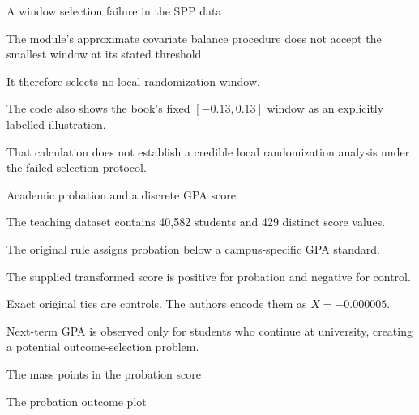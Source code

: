 \begin{frame}{A window selection failure in the SPP data}
\begin{items}
\item The module's approximate covariate balance procedure does not accept the smallest window at its stated threshold.
\item It therefore selects no local randomization window.
\item The code also shows the book's fixed $[-0.13,0.13]$ window as an explicitly labelled illustration.
\item That calculation does not establish a credible local randomization analysis under the failed selection protocol.
\end{items}
\end{frame}

\begin{frame}{Academic probation and a discrete GPA score}
\begin{items}
\item The teaching dataset contains 40,582 students and 429 distinct score values.
\item The original rule assigns probation below a campus-specific GPA standard.
\item The supplied transformed score is positive for probation and negative for control.
\item Exact original ties are controls. The authors encode them as $X=-0.000005$.
\item Next-term GPA is observed only for students who continue at university, creating a potential outcome-selection problem.
\end{items}
\end{frame}

\begin{frame}{The mass points in the probation score}
\end{frame}

\begin{frame}{The probation outcome plot}
\end{frame}

